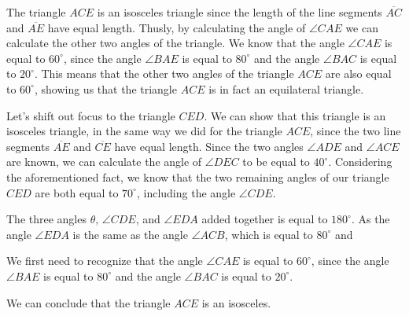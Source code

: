 \documentclass{article}
\theoremstyle{maintheorem}
\begin{document}
The triangle $ACE$ is an isosceles triangle since the length of the line segments $\overline{AC}$ and $\overline{AE}$ have equal length. Thusly, by calculating the angle of $\angle CAE$ we can calculate the other two angles of the triangle.
We know that the angle $\angle CAE$ is equal to $60^\circ$, since the angle $\angle BAE$ is equal to $80^\circ$ and the angle $\angle BAC$ is equal to $20^\circ$.
This means that the other two angles of the triangle $ACE$ are also equal to $60^\circ$, showing us that the triangle $ACE$ is in fact an equilateral triangle.

Let's shift out focus to the triangle $CED$.
We can show that this triangle is an isosceles triangle, in the same way we did for the triangle $ACE$, since the two line segments $\overline{AE}$ and $\overline{CE}$ have equal length.
Since the two angles $\angle ADE$ and $\angle ACE$ are known, we can calculate the angle of $\angle DEC$ to be equal to $40^\circ$.
Considering the aforementioned fact, we know that the two remaining angles of our triangle $CED$ are both equal to $70^\circ$, including the angle $\angle CDE$.

The three angles $\theta$, $\angle CDE$, and $\angle EDA$ added together is equal to $180^\circ$. As the angle $\angle EDA$ is the same as the angle $\angle ACB$, which is equal to $80^\circ$ and

We first need to recognize that the angle $\angle CAE$ is equal to $60^\circ$, since the angle $\angle BAE$ is equal to $80^\circ$ and the angle $\angle BAC$ is equal to $20^\circ$.

We can conclude that the triangle $ACE$ is an isosceles.
\end{document}
